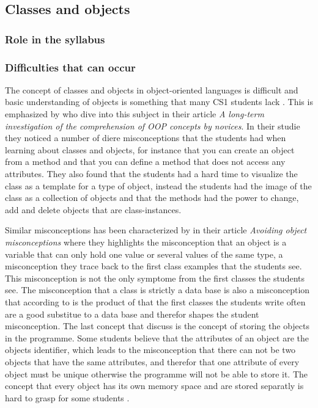 \subsection{Classes and objects}

\subsubsection{Role in the syllabus}

\subsubsection{Difficulties that can occur}

The concept of classes and objects in object-oriented languages is difficult and basic understanding of objects is something that many CS1 students lack \parencite{Kaczmarczyk2010}. This is emphasized by \textcite{Ragonis2005OOP} who dive into this subject in their article \emph{A long-term investigation of the comprehension of OOP concepts by novices}. In their studie they noticed a number of diere misconceptions that the students had when learning about classes and objects, for instance that you can create an object from a method and that you can define a method that does not access any attributes. They also found that the students had a hard time to visualize the class as a template for a type of object, instead the students had the image of the class as a collection of objects and that the methods had the power to change, add and delete objects that are class-instances. 

Similar misconceptions has been characterized by \textcite{Holland1997} in their article \emph{Avoiding object misconceptions} where they highlights the misconception that an object is a variable that can only hold one value or several values of the same type, a misconception they trace back to the first class examples that the students see. This misconception is not the only symptome from the first classes the students see. The misconception that a class is strictly a data base is also a misconception that according to \textcite{Holland1997} is the product of that the first classes the students write often are a good substitue to a data base and therefor shapes the student misconception. The last concept that \textcite{Holland1997} discuss is the concept of storing the objects in the programme. Some students believe that the attributes of an object are the objects identifier, which leads to the misconception that there can not be two objects that have the same attributes, and therefor that one attribute of every object must be unique otherwise the programme will not be able to store it. The concept that every object has its own memory space and are stored separatly is hard to grasp for some students \parencite{Holland1997,Ragonis2005OOP}. 

